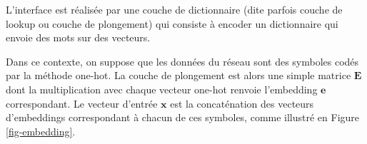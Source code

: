 \documentclass[11pt,openany]{book}
\begin{document}
L'interface est réalisée par une couche de dictionnaire (dite parfois
couche de lookup ou couche de plongement) qui consiste à encoder un
dictionnaire qui envoie des mots sur des vecteurs.

Dans ce contexte, on suppose que les données du réseau 
sont des symboles codés par la méthode one-hot. 
La couche de plongement est alors une simple matrice $\mathbf{E}$ dont
la multiplication avec chaque vecteur one-hot renvoie l'embedding $\mathbf{e}$
correspondant. Le vecteur d'entrée $\mathbf{x}$ est la concaténation
des vecteurs d'embeddings correspondant à chacun de ces symboles,
comme illustré en Figure \ref{fig-embedding}.

\begin{figure}
\end{figure}
\end{document}
